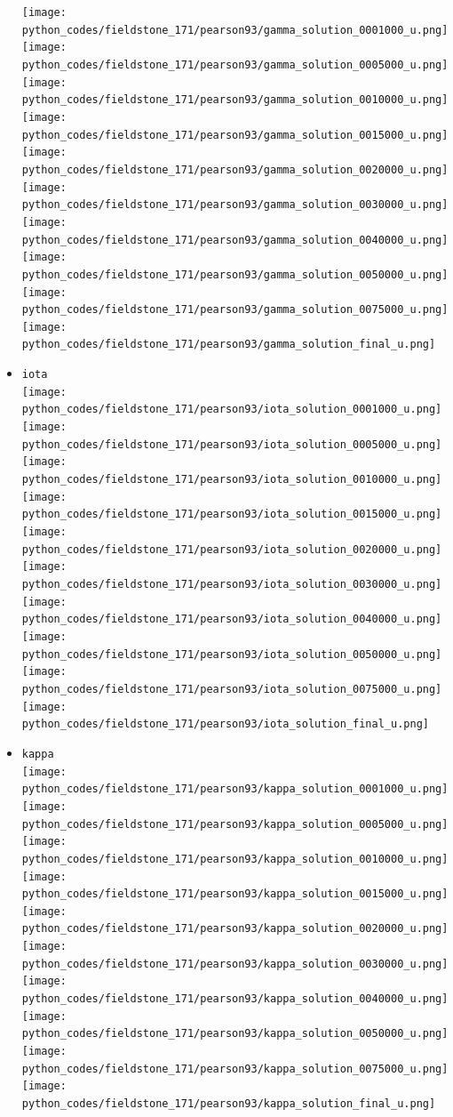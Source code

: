 \begin{itemize}
\texttt{[image: python\_codes/fieldstone\_171/pearson93/gamma\_solution\_0001000\_u.png]}
\texttt{[image: python\_codes/fieldstone\_171/pearson93/gamma\_solution\_0005000\_u.png]}
\texttt{[image: python\_codes/fieldstone\_171/pearson93/gamma\_solution\_0010000\_u.png]}
\texttt{[image: python\_codes/fieldstone\_171/pearson93/gamma\_solution\_0015000\_u.png]}
\texttt{[image: python\_codes/fieldstone\_171/pearson93/gamma\_solution\_0020000\_u.png]}\\
\texttt{[image: python\_codes/fieldstone\_171/pearson93/gamma\_solution\_0030000\_u.png]}
\texttt{[image: python\_codes/fieldstone\_171/pearson93/gamma\_solution\_0040000\_u.png]}
\texttt{[image: python\_codes/fieldstone\_171/pearson93/gamma\_solution\_0050000\_u.png]}
\texttt{[image: python\_codes/fieldstone\_171/pearson93/gamma\_solution\_0075000\_u.png]}
\texttt{[image: python\_codes/fieldstone\_171/pearson93/gamma\_solution\_final\_u.png]}
\item {\tt iota}\\
\texttt{[image: python\_codes/fieldstone\_171/pearson93/iota\_solution\_0001000\_u.png]}
\texttt{[image: python\_codes/fieldstone\_171/pearson93/iota\_solution\_0005000\_u.png]}
\texttt{[image: python\_codes/fieldstone\_171/pearson93/iota\_solution\_0010000\_u.png]}
\texttt{[image: python\_codes/fieldstone\_171/pearson93/iota\_solution\_0015000\_u.png]}
\texttt{[image: python\_codes/fieldstone\_171/pearson93/iota\_solution\_0020000\_u.png]}\\
\texttt{[image: python\_codes/fieldstone\_171/pearson93/iota\_solution\_0030000\_u.png]}
\texttt{[image: python\_codes/fieldstone\_171/pearson93/iota\_solution\_0040000\_u.png]}
\texttt{[image: python\_codes/fieldstone\_171/pearson93/iota\_solution\_0050000\_u.png]}
\texttt{[image: python\_codes/fieldstone\_171/pearson93/iota\_solution\_0075000\_u.png]}
\texttt{[image: python\_codes/fieldstone\_171/pearson93/iota\_solution\_final\_u.png]}
\item {\tt kappa}\\
\texttt{[image: python\_codes/fieldstone\_171/pearson93/kappa\_solution\_0001000\_u.png]}
\texttt{[image: python\_codes/fieldstone\_171/pearson93/kappa\_solution\_0005000\_u.png]}
\texttt{[image: python\_codes/fieldstone\_171/pearson93/kappa\_solution\_0010000\_u.png]}
\texttt{[image: python\_codes/fieldstone\_171/pearson93/kappa\_solution\_0015000\_u.png]}
\texttt{[image: python\_codes/fieldstone\_171/pearson93/kappa\_solution\_0020000\_u.png]}\\
\texttt{[image: python\_codes/fieldstone\_171/pearson93/kappa\_solution\_0030000\_u.png]}
\texttt{[image: python\_codes/fieldstone\_171/pearson93/kappa\_solution\_0040000\_u.png]}
\texttt{[image: python\_codes/fieldstone\_171/pearson93/kappa\_solution\_0050000\_u.png]}
\texttt{[image: python\_codes/fieldstone\_171/pearson93/kappa\_solution\_0075000\_u.png]}
\texttt{[image: python\_codes/fieldstone\_171/pearson93/kappa\_solution\_final\_u.png]}


\end{itemize}
